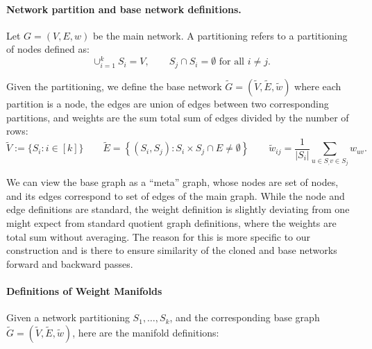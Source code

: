 \documentclass{article}
\newcommand{\BaseW}{\widetilde{w}}
\newcommand{\BaseG}{\widetilde{G}}
\newcommand{\BaseV}{\widetilde{V}}
\newcommand{\BaseE}{\widetilde{E}}
\numberwithin{figure}{section}
\begin{document}


\paragraph{Network partition and base network definitions.}
Let $G = (V, E, w)$ be the main network. A partitioning refers to a partitioning of nodes defined as:
$$
\cup_{i=1}^k S_i = V, \qquad S_j\cap S_i=\emptyset\text{ for all } i\neq j.
$$

Given the partitioning, we  define the base network $\BaseG = (\BaseV, \BaseE, \BaseW)$ where each partition is a node, the edges are union of edges between two corresponding partitions, and weights are the sum total sum of edges divided by the number of rows:
$$
\BaseV:=\{S_i: i\in[k]\}
\qquad 
\BaseE = \left\{(S_i,S_j): S_i\times S_j\cap E\neq \emptyset \right\}
\qquad
\BaseW_{ij} = \frac{1}{|S_i|}\sum_{u\in S_,v\in S_j} w_{uv}.
$$

We can view the base graph as a ``meta'' graph, whose nodes are set of nodes, and its edges correspond to set of edges of the main graph. While the node and edge definitions are standard, the weight definition is slightly deviating from one might expect from standard quotient graph definitions, where the weights are total sum without averaging. The reason for this is more specific to our construction and is there to ensure similarity of the cloned and base networks forward and backward passes. 


\paragraph{Definitions of Weight Manifolds}
Given a network partitioning $S_1,\dots , S_k$, and the corresponding base graph $\BaseG = (\BaseV, \BaseE, \BaseW)$, here are the manifold definitions:
\end{document}
